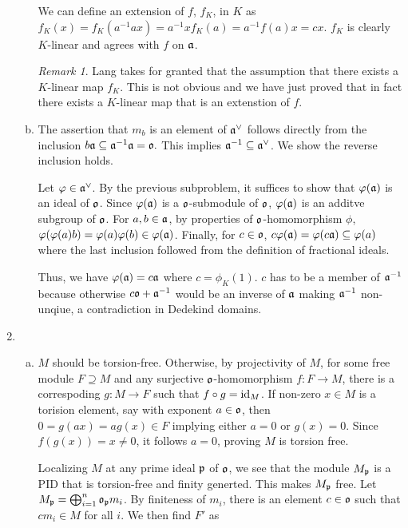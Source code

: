 \documentclass{article}
\theoremstyle{definition}
\theoremstyle{remark}
\newtheorem{remark}[theorem]{Remark}
\begin{document}
\begin{enumerate}[(1)]
\begin{enumerate}[(a)]
                We can define an extension of $f$, $f_K$, in $K$ as $f_K(x) = f_K(a^{-1}ax) = a^{-1}xf_K(a) = a^{-1}f(a)x = cx.$ $f_K$ is clearly $K$-linear and agrees with $f$ on $\mathfrak{a}$.
                \begin{remark}
                  Lang takes for granted that the assumption that there exists a $K$-linear map $f_K$. This is not obvious and we have just proved that in fact there exists a $K$-linear map that is an extenstion of $f$.
                \end{remark}

          \item
                The assertion that $m_b$ is an element of $\mathfrak{a}^{\vee}$ follows directly from the inclusion $b\mathfrak{a} \subseteq \mathfrak{a}^{-1} \mathfrak{a} = \mathfrak{o}.$ This implies $\mathfrak{a}^{-1} \subseteq \mathfrak{a}^{\vee}$. We show the reverse inclusion holds.

                Let $\varphi \in \mathfrak{a}^{\vee}$. By the previous subproblem, it suffices to show that $\varphi(\mathfrak{a})$ is an ideal of $\mathfrak{o}$. Since $\varphi(\mathfrak{a})$ is a $\mathfrak{o}$-submodule of $\mathfrak{o}$, $\varphi(\mathfrak{a})$ is an additve subgroup of $\mathfrak{o}$. For $a, b \in \mathfrak{a}$, by properties of $\mathfrak{o}$-homomorphism $\phi$, $\varphi(\varphi(a)b) = \varphi(a)\varphi(b) \in \varphi(\mathfrak{a})$. Finally,
                for $c \in \mathfrak{o}$, $c\varphi(\mathfrak{a}) = \varphi(c\mathfrak{a}) \subseteq \varphi(a)$ where the last inclusion followed from the definition of fractional ideals.

                Thus, we have $\varphi(\mathfrak{a}) = c\mathfrak{a}$ where $c = \phi_K(1)$. $c$ has to be a member of $\mathfrak{a}^{-1}$ because otherwise $c\mathfrak{o} + \mathfrak{a}^{-1}$ would be an inverse of $\mathfrak{a}$ making $\mathfrak{a}^{-1}$ non-unqiue, a contradiction in Dedekind domains.

    \end{enumerate}
        \item \begin{enumerate}[(a)]
                \item
                      $M$ should be torsion-free. Otherwise, by projectivity of $M$, for some free module $F \supseteq M$ and any surjective $\mathfrak{o}$-homomorphism $f: F \to M$, there is a correspoding $g: M \to F$ such that $f \circ g = \text{id}_M$. If non-zero $x \in M$ is a torision element, say with exponent $a \in \mathfrak{o}$, then $0 = g(ax) = ag(x) \in F$ implying either $a = 0$ or $g(x) = 0$. Since $f(g(x)) = x \neq 0$, it follows $a = 0$, proving $M$ is torsion free.

                      Localizing $M$ at any prime ideal $\mathfrak{p}$ of $\mathfrak{o}$, we see that the module $M_{\mathfrak{p}}$ is a PID that is torsion-free and finity generted. This makes $M_{\mathfrak{p}}$ free. Let $M_{\mathfrak{p}} = \bigoplus_{i=1}^n \mathfrak{o}_{\mathfrak{p}} m_i$. By finiteness of $m_i$, there is an element $c \in \mathfrak{o}$ such that $cm_i \in M$ for all $i$. We then find $F'$ as


\end{enumerate}
\end{enumerate}
\end{document}
